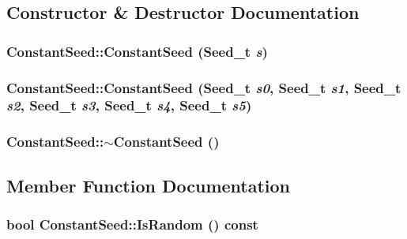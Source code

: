 \subsection{Constructor \& Destructor Documentation}
\hypertarget{classConstantSeed_09dba071989c2d0d374c64c96cfdecc5}{
\subsubsection[{ConstantSeed}]{\setlength{\rightskip}{0pt plus 5cm}ConstantSeed::ConstantSeed ({\bf Seed\_\-t} {\em s})}}
\label{classConstantSeed_09dba071989c2d0d374c64c96cfdecc5}


\hypertarget{classConstantSeed_b7706d24effc3222d0d284853d15b099}{
\subsubsection[{ConstantSeed}]{\setlength{\rightskip}{0pt plus 5cm}ConstantSeed::ConstantSeed ({\bf Seed\_\-t} {\em s0}, \/  {\bf Seed\_\-t} {\em s1}, \/  {\bf Seed\_\-t} {\em s2}, \/  {\bf Seed\_\-t} {\em s3}, \/  {\bf Seed\_\-t} {\em s4}, \/  {\bf Seed\_\-t} {\em s5})}}
\label{classConstantSeed_b7706d24effc3222d0d284853d15b099}


\hypertarget{classConstantSeed_4c1bc70217c0522c76ebad617bd95f0d}{
\subsubsection[{$\sim$ConstantSeed}]{\setlength{\rightskip}{0pt plus 5cm}ConstantSeed::$\sim$ConstantSeed ()}}
\label{classConstantSeed_4c1bc70217c0522c76ebad617bd95f0d}




\subsection{Member Function Documentation}
\hypertarget{classConstantSeed_38790f9390c6c4d6d27a2f60f1df438f}{
\subsubsection[{IsRandom}]{\setlength{\rightskip}{0pt plus 5cm}bool ConstantSeed::IsRandom () const}}
\label{classConstantSeed_38790f9390c6c4d6d27a2f60f1df438f}




